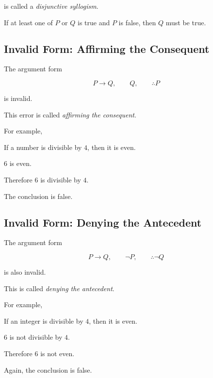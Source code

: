 is called a \emph{disjunctive syllogism}.

If at least one of \(P\) or \(Q\) is true and \(P\) is false, then \(Q\)
must be true.

\subsection{Invalid Form: Affirming the Consequent}
\label{subsec:affirming-consequent}

The argument form

\[ P\to Q,\qquad Q,\qquad \therefore P \]

is invalid.

This error is called \emph{affirming the consequent}.

For example,

\begin{center}
If a number is divisible by \(4\), then it is even.

\(6\) is even.

Therefore \(6\) is divisible by \(4\).
\end{center}

The conclusion is false.

\subsection{Invalid Form: Denying the Antecedent}
\label{subsec:denying-antecedent}

The argument form

\[ P\to Q,\qquad \neg P,\qquad \therefore\neg Q \]

is also invalid.

This is called \emph{denying the antecedent}.

For example,

\begin{center}
If an integer is divisible by \(4\), then it is even.

\(6\) is not divisible by \(4\).

Therefore \(6\) is not even.
\end{center}

Again, the conclusion is false.


